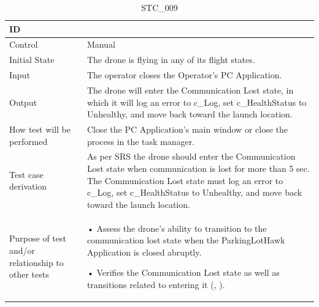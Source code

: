 \documentclass[12pt, titlepage]{article}
\begin{document}
\begin{table}[!h]
\begin{center}
\caption {STC\_009}
\label{tab:STC_009}
\begin{tabular}{ | m{3.2cm} | m{12.2cm} | } 
\hline
ID & \nameref{tab:STC_009} \\ 
\hline
Control & Manual \\ 
\hline
Initial State & The drone is flying in any of its flight states. \\ 
\hline
Input & The operator closes the Operator's PC Application. \\ 
\hline
Output & The drone will enter the Communication Lost state, in which it will log an error to c_Log, set c_HealthStatus to Unhealthy, and move back toward the launch location. \\ 
\hline
How test will be performed & Close the PC Application's main window or close the process in the task manager. \\ 
\hline
Test case derivation & As per SRS the drone should enter the Communication Lost state when communication is lost for more than 5 sec. The Communication Lost state must log an error to c_Log, set c_HealthStatus to Unhealthy, and move back toward the launch location. \\ 
\hline
Purpose of test and/or relationship to other tests &  • Assess the drone's ability to transition to the communication lost state when the ParkingLotHawk Application is closed abruptly.

• Verifies the Communication Lost state as well as transitions related to entering it (\nameref{STA_010}, \nameref{TRANS_010}).  
\\ 
\hline
\end{tabular}
\end{center}
\end{table}
\end{document}
